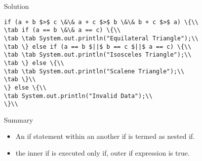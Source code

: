 \documentclass[aspectratio=169,14pt,usenames,dvipsnames]{beamer}
\newcommand\tab[1][1cm]{\hspace*{#1}}
\begin{document}
\begin{frame}{Solution}
\begin{lstlisting}
if (a + b $>$ c \&\& a + c $>$ b \&\& b + c $>$ a) \{\\
\tab if (a == b \&\& a == c) \{\\
\tab \tab System.out.println("Equilateral Triangle");\\
\tab \} else if (a == b $||$ b == c $||$ a == c) \{\\
\tab \tab System.out.println("Isosceles Triangle");\\
\tab \} else \{\\
\tab \tab System.out.println("Scalene Triangle");\\
\tab \}\\
\} else \{\\
\tab System.out.println("Invalid Data");\\
\}\\
\end{lstlisting}
\end{frame}


\begin{frame}{Summary}
\begin{itemize}
    \item An if statement within an another if is
termed as nested if.
\item the inner if is executed only if, outer if
expression is true.
\end{itemize}
\end{frame}
\end{document}
